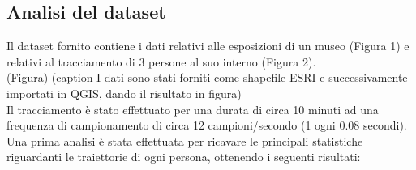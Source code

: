 \documentclass[12pt]{article}
\begin{document}
\subsection{Analisi del dataset}
Il dataset fornito contiene i dati relativi alle esposizioni di un museo (Figura 1) e relativi al tracciamento di 3 persone al suo interno (Figura 2).
\\[12pt](Figura) (caption I dati sono stati forniti come shapefile ESRI e successivamente importati in QGIS, dando il risultato in figura)\\[12pt]
Il tracciamento è stato effettuato per una durata di circa 10 minuti ad una frequenza di campionamento di circa 12 campioni/secondo (1 ogni 0.08 secondi). Una prima analisi è stata effettuata per ricavare le principali statistiche riguardanti le traiettorie di ogni persona, ottenendo i seguenti risultati:
\end{document}
